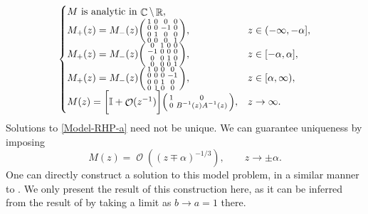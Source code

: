 \documentclass[usenames,dvipsnames]{article}
\theoremstyle{definition}
\DeclareMathOperator{\CC}{\mathbb{C}}
\DeclareMathOperator{\RR}{\mathbb{R}}
\DeclareMathOperator{\OO}{\mathcal{O}}
\numberwithin{equation}{section}
\numberwithin{figure}{section}
\begin{document}
\begin{equation}\label{Model-RHP-a}
    \begin{cases}
        \text{$M$ is analytic in $\CC\setminus\RR$},\\
        M_+(z) = M_-(z)
        \begin{psmallmatrix}
            1 & 0 & 0 & 0\\
            0 & 0 & -1 & 0\\
            0 & 1 & 0 & 0\\
            0 & 0 & 0 & 1\\
        \end{psmallmatrix}, & z \in (-\infty,-\alpha],\\
        M_+(z) = M_-(z)
        \begin{psmallmatrix}
            0 & 1 & 0 & 0\\
            -1 & 0 & 0 & 0\\
            0 & 0 & 1 & 0\\
            0 & 0 & 0 & 1\\
        \end{psmallmatrix}, & z \in [-\alpha,\alpha],\\
        M_+(z) = M_-(z)
        \begin{psmallmatrix}
            1 & 0 & 0 & 0\\
            0 & 0 & 0 & -1\\
            0 & 0 & 1 & 0\\
            0 & 1 & 0 & 0\\
        \end{psmallmatrix}, & z \in [\alpha,\infty),\\
        M(z) = 
        \bigg[\mathbb{I} + \OO(z^{-1})\bigg]
            \begin{psmallmatrix}
                1 & 0\\
                0 & B^{-1}(z) A^{-1}(z)
            \end{psmallmatrix},
             & z \to \infty.
        \end{cases}
\end{equation}
Solutions to \eqref{Model-RHP-a} need not be unique. We can guarantee uniqueness by imposing
\begin{equation}\label{global-parametrix-constraint}
        M(z) = \OO( (z\mp \alpha)^{-1/3} ),  \qquad z\to \pm \alpha.
\end{equation}
One can directly construct a solution to this model problem, in a similar manner to \cite{DHL1}. We only present the result of 
this construction here, as it can be inferred from the result of \cite{DHL1} by taking a limit as $b\to a = 1$ there.
\end{document}
